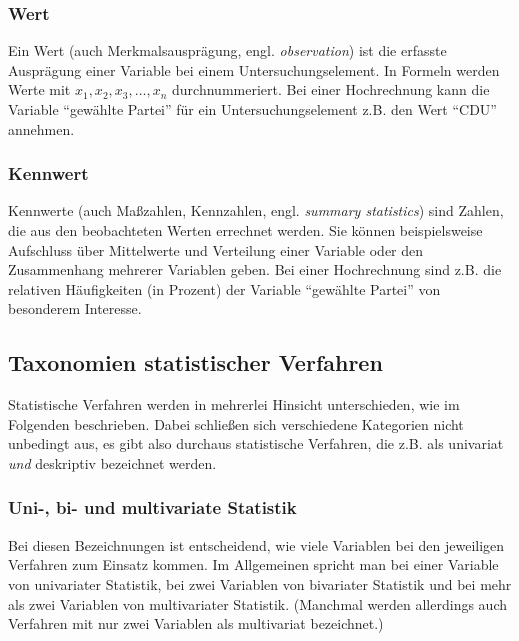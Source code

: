 \documentclass[
  11pt,
  ngerman,
  a4paper,
]{report}
\begin{document}
\hypertarget{wert}{%
\subsubsection{Wert}\label{wert}}

Ein Wert (auch Merkmalsausprägung, engl. \emph{observation}) ist die erfasste Ausprägung einer Variable bei einem Untersuchungselement. In Formeln werden Werte mit \(x_1, x_2, x_3, ..., x_n\) durchnummeriert. Bei einer Hochrechnung kann die Variable \enquote{gewählte Partei} für ein Untersuchungselement z.B. den Wert \enquote{CDU} annehmen.

\hypertarget{kennwert}{%
\subsubsection{Kennwert}\label{kennwert}}

Kennwerte (auch Maßzahlen, Kennzahlen, engl. \emph{summary statistics}) sind Zahlen, die aus den beobachteten Werten errechnet werden. Sie können beispielsweise Aufschluss über Mittelwerte und Verteilung einer Variable oder den Zusammenhang mehrerer Variablen geben. Bei einer Hochrechnung sind z.B. die relativen Häufigkeiten (in Prozent) der Variable \enquote{gewählte Partei} von besonderem Interesse.

\hypertarget{taxonomien-statistischer-verfahren}{%
\subsection{Taxonomien statistischer Verfahren}\label{taxonomien-statistischer-verfahren}}

Statistische Verfahren werden in mehrerlei Hinsicht unterschieden, wie im Folgenden beschrieben. Dabei schließen sich verschiedene Kategorien nicht unbedingt aus, es gibt also durchaus statistische Verfahren, die z.B. als univariat \emph{und} deskriptiv bezeichnet werden.

\hypertarget{uni--bi--und-multivariate-statistik}{%
\subsubsection{Uni-, bi- und multivariate Statistik}\label{uni--bi--und-multivariate-statistik}}

Bei diesen Bezeichnungen ist entscheidend, wie viele Variablen bei den jeweiligen Verfahren zum Einsatz kommen. Im Allgemeinen spricht man bei einer Variable von univariater Statistik, bei zwei Variablen von bivariater Statistik und bei mehr als zwei Variablen von multivariater Statistik. (Manchmal werden allerdings auch Verfahren mit nur zwei Variablen als multivariat bezeichnet.)
\end{document}
